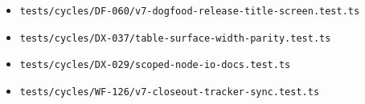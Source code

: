 \begin{itemize}
\tightlist
\item
  \texttt{t\allowbreak{}e\allowbreak{}s\allowbreak{}t\allowbreak{}s\allowbreak{}/\allowbreak{}c\allowbreak{}y\allowbreak{}c\allowbreak{}l\allowbreak{}e\allowbreak{}s\allowbreak{}/\allowbreak{}D\allowbreak{}F\allowbreak{}-\allowbreak{}0\allowbreak{}6\allowbreak{}0\allowbreak{}/\allowbreak{}v\allowbreak{}7\allowbreak{}-\allowbreak{}d\allowbreak{}o\allowbreak{}g\allowbreak{}f\allowbreak{}o\allowbreak{}o\allowbreak{}d\allowbreak{}-\allowbreak{}r\allowbreak{}e\allowbreak{}l\allowbreak{}e\allowbreak{}a\allowbreak{}s\allowbreak{}e\allowbreak{}-\allowbreak{}t\allowbreak{}i\allowbreak{}t\allowbreak{}l\allowbreak{}e\allowbreak{}-\allowbreak{}s\allowbreak{}c\allowbreak{}r\allowbreak{}e\allowbreak{}e\allowbreak{}n\allowbreak{}.\allowbreak{}t\allowbreak{}e\allowbreak{}s\allowbreak{}t\allowbreak{}.\allowbreak{}t\allowbreak{}s}
\item
  \texttt{t\allowbreak{}e\allowbreak{}s\allowbreak{}t\allowbreak{}s\allowbreak{}/\allowbreak{}c\allowbreak{}y\allowbreak{}c\allowbreak{}l\allowbreak{}e\allowbreak{}s\allowbreak{}/\allowbreak{}D\allowbreak{}X\allowbreak{}-\allowbreak{}0\allowbreak{}3\allowbreak{}7\allowbreak{}/\allowbreak{}t\allowbreak{}a\allowbreak{}b\allowbreak{}l\allowbreak{}e\allowbreak{}-\allowbreak{}s\allowbreak{}u\allowbreak{}r\allowbreak{}f\allowbreak{}a\allowbreak{}c\allowbreak{}e\allowbreak{}-\allowbreak{}w\allowbreak{}i\allowbreak{}d\allowbreak{}t\allowbreak{}h\allowbreak{}-\allowbreak{}p\allowbreak{}a\allowbreak{}r\allowbreak{}i\allowbreak{}t\allowbreak{}y\allowbreak{}.\allowbreak{}t\allowbreak{}e\allowbreak{}s\allowbreak{}t\allowbreak{}.\allowbreak{}t\allowbreak{}s}
\item
  \texttt{t\allowbreak{}e\allowbreak{}s\allowbreak{}t\allowbreak{}s\allowbreak{}/\allowbreak{}c\allowbreak{}y\allowbreak{}c\allowbreak{}l\allowbreak{}e\allowbreak{}s\allowbreak{}/\allowbreak{}D\allowbreak{}X\allowbreak{}-\allowbreak{}0\allowbreak{}2\allowbreak{}9\allowbreak{}/\allowbreak{}s\allowbreak{}c\allowbreak{}o\allowbreak{}p\allowbreak{}e\allowbreak{}d\allowbreak{}-\allowbreak{}n\allowbreak{}o\allowbreak{}d\allowbreak{}e\allowbreak{}-\allowbreak{}i\allowbreak{}o\allowbreak{}-\allowbreak{}d\allowbreak{}o\allowbreak{}c\allowbreak{}s\allowbreak{}.\allowbreak{}t\allowbreak{}e\allowbreak{}s\allowbreak{}t\allowbreak{}.\allowbreak{}t\allowbreak{}s}
\item
  \texttt{t\allowbreak{}e\allowbreak{}s\allowbreak{}t\allowbreak{}s\allowbreak{}/\allowbreak{}c\allowbreak{}y\allowbreak{}c\allowbreak{}l\allowbreak{}e\allowbreak{}s\allowbreak{}/\allowbreak{}W\allowbreak{}F\allowbreak{}-\allowbreak{}1\allowbreak{}2\allowbreak{}6\allowbreak{}/\allowbreak{}v\allowbreak{}7\allowbreak{}-\allowbreak{}c\allowbreak{}l\allowbreak{}o\allowbreak{}s\allowbreak{}e\allowbreak{}o\allowbreak{}u\allowbreak{}t\allowbreak{}-\allowbreak{}t\allowbreak{}r\allowbreak{}a\allowbreak{}c\allowbreak{}k\allowbreak{}e\allowbreak{}r\allowbreak{}-\allowbreak{}s\allowbreak{}y\allowbreak{}n\allowbreak{}c\allowbreak{}.\allowbreak{}t\allowbreak{}e\allowbreak{}s\allowbreak{}t\allowbreak{}.\allowbreak{}t\allowbreak{}s}

\end{itemize}
